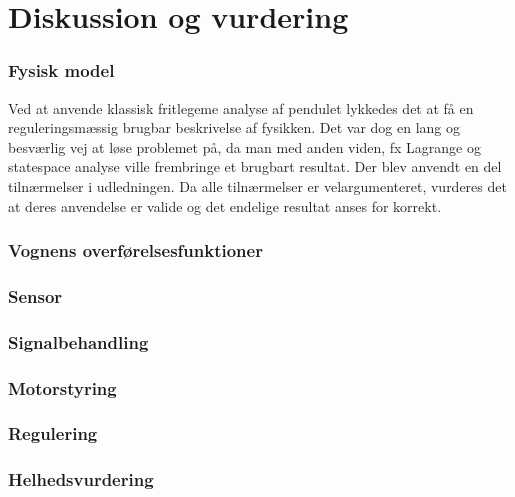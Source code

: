 \chapter{Diskussion og vurdering}\label{kap:diskussion}

\subsection{Fysisk model}
Ved at anvende klassisk fritlegeme analyse af pendulet lykkedes det at få en reguleringsmæssig brugbar beskrivelse af fysikken. 
Det var dog en lang og besværlig vej at løse problemet på, da man med anden viden, fx Lagrange og statespace analyse ville frembringe et brugbart resultat.
Der blev anvendt en del tilnærmelser i udledningen. 
Da alle tilnærmelser er velargumenteret, vurderes det at deres anvendelse er valide og det endelige resultat anses for korrekt.   

\subsection{Vognens overførelsesfunktioner}

\subsection{Sensor}


\subsection{Signalbehandling}

\subsection{Motorstyring}

\subsection{Regulering}

\subsection{Helhedsvurdering}

